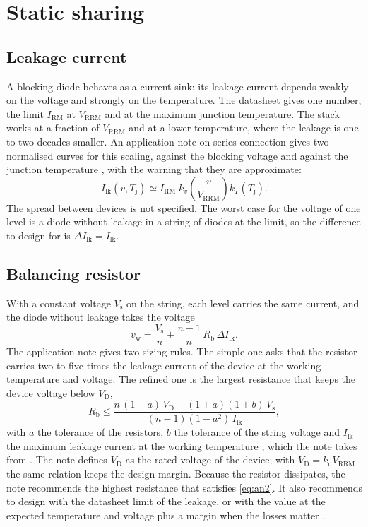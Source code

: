 \documentclass[10pt,a4paper]{scrartcl}
\newcommand{\Vrrm}{V_\mathrm{RRM}}
\newcommand{\Irm}{I_\mathrm{RM}}
\newcommand{\Rb}{R_\mathrm{b}}
\newcommand{\Tj}{T_\mathrm{j}}
\newcommand{\Ilk}{I_\mathrm{lk}}
\newcommand{\ku}{k_\mathrm{u}}
\begin{document}
\section{Static sharing}
\label{sec:static}
\subsection{Leakage current}
A blocking diode behaves as a current sink: its leakage current depends weakly on the voltage and strongly on the temperature. The datasheet gives one number, the limit $\Irm$ at $\Vrrm$ and at the maximum junction temperature. The stack works at a fraction of $\Vrrm$ and at a lower temperature, where the leakage is one to two decades smaller. An application note on series connection gives two normalised curves for this scaling, against the blocking voltage and against the junction temperature \cite[Fig.~4]{an6531}, with the warning that they are approximate:
\begin{equation}
\Ilk(v, \Tj) \simeq \Irm\; k_v\!\left(\frac{v}{\Vrrm}\right) k_T(\Tj) .
\label{eq:ilk}
\end{equation}
The spread between devices is not specified. The worst case for the voltage of one level is a diode without leakage in a string of diodes at the limit, so the difference to design for is $\Delta\Ilk = \Ilk$.

\subsection{Balancing resistor}
With a constant voltage $V_\mathrm{s}$ on the string, each level carries the same current, and the diode without leakage takes the voltage
\begin{equation}
v_\mathrm{w} = \frac{V_\mathrm{s}}{n} + \frac{n-1}{n}\,\Rb\,\Delta\Ilk .
\label{eq:static}
\end{equation}
The application note \cite[Sec.~2.2.1]{an6531} gives two sizing rules. The simple one asks that the resistor carries two to five times the leakage current of the device at the working temperature and voltage. The refined one is the largest resistance that keeps the device voltage below $V_\mathrm{D}$,
\begin{equation}
\Rb \le \frac{n\,(1-a)\,V_\mathrm{D} - (1+a)(1+b)\,V_\mathrm{s}}{(n-1)(1-a^2)\,\Ilk},
\label{eq:an2}
\end{equation}
with $a$ the tolerance of the resistors, $b$ the tolerance of the string voltage and $\Ilk$ the maximum leakage current at the working temperature \cite[Eq.~(2)]{an6531}, which the note takes from \cite{williams}. The note defines $V_\mathrm{D}$ as the rated voltage of the device; with $V_\mathrm{D} = \ku\Vrrm$ the same relation keeps the design margin. Because the resistor dissipates, the note recommends the highest resistance that satisfies \eqref{eq:an2}. It also recommends to design with the datasheet limit of the leakage, or with the value at the expected temperature and voltage plus a margin when the losses matter \cite[Sec.~2.2.4]{an6531}.
\end{document}
